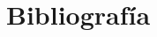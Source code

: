 \documentclass[11pt]{beamer}
\begin{document}
%
%
%
%
%
%
%
%
%


\section{Bibliografía}
\end{document}
